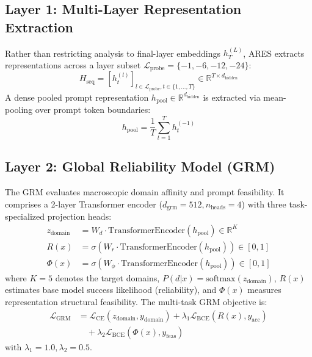 \documentclass[journal,10pt,twocolumn]{IEEEtran}
\begin{document}
\subsection{Layer 1: Multi-Layer Representation Extraction}
Rather than restricting analysis to final-layer embeddings $h_T^{(L)}$, ARES extracts representations across a layer subset $\mathcal{L}_{\text{probe}} = \{-1, -6, -12, -24\}$:
\begin{equation}
H_{\text{seq}} = \left[ h_t^{(l)} \right]_{l \in \mathcal{L}_{\text{probe}}, t \in \{1, \dots, T\}} \in \mathbb{R}^{T \times d_{\text{hidden}}}
\end{equation}
A dense pooled prompt representation $h_{\text{pool}} \in \mathbb{R}^{d_{\text{hidden}}}$ is extracted via mean-pooling over prompt token boundaries:
\begin{equation}
h_{\text{pool}} = \frac{1}{T} \sum_{t=1}^T h_t^{(-1)}
\end{equation}

\subsection{Layer 2: Global Reliability Model (GRM)}
The GRM evaluates macroscopic domain affinity and prompt feasibility. It comprises a 2-layer Transformer encoder ($d_{\text{grm}} = 512, n_{\text{heads}} = 4$) with three task-specialized projection heads:
\begin{align}
z_{\text{domain}} &= W_d \cdot \text{TransformerEncoder}(h_{\text{pool}}) \in \mathbb{R}^{K} \\
R(x) &= \sigma(W_r \cdot \text{TransformerEncoder}(h_{\text{pool}})) \in [0, 1] \\
\Phi(x) &= \sigma(W_\phi \cdot \text{TransformerEncoder}(h_{\text{pool}})) \in [0, 1]
\end{align}
where $K=5$ denotes the target domains, $P(d|x) = \text{softmax}(z_{\text{domain}})$, $R(x)$ estimates base model success likelihood (reliability), and $\Phi(x)$ measures representation structural feasibility. The multi-task GRM objective is:
\begin{equation}
\begin{split}
\mathcal{L}_{\text{GRM}} &= \mathcal{L}_{\text{CE}}(z_{\text{domain}}, y_{\text{domain}}) + \lambda_1 \mathcal{L}_{\text{BCE}}(R(x), y_{\text{acc}}) \\
&\quad + \lambda_2 \mathcal{L}_{\text{BCE}}(\Phi(x), y_{\text{feas}})
\end{split}
\end{equation}
with $\lambda_1 = 1.0, \lambda_2 = 0.5$.
\end{document}
